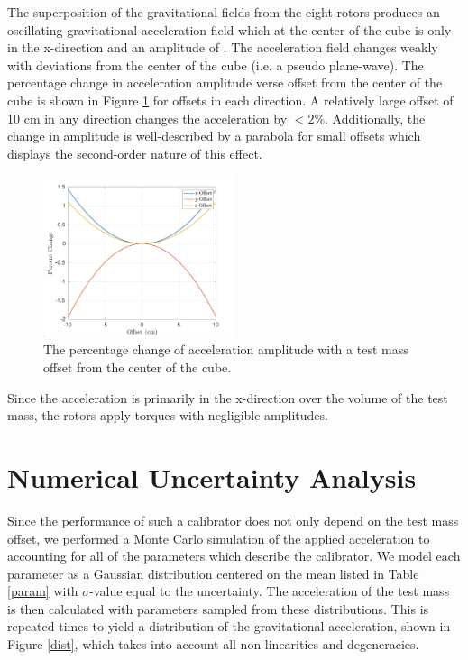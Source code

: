\documentclass[superscriptaddress, twocolumn, prd]{revtex4-1}
\begin{document}
The superposition of the gravitational fields from the eight rotors produces an oscillating gravitational acceleration field which at the center of the cube is only in the x-direction and an amplitude of . The acceleration field changes weakly with deviations from the center of the cube (i.e. a pseudo plane-wave). The percentage change in acceleration amplitude verse offset from the center of the cube is shown in Figure \ref{offset} for offsets in each direction. A relatively large offset of 10 cm in any direction changes the acceleration by $<2\%$. Additionally, the change in amplitude is well-described by a parabola for small offsets which displays the second-order nature of this effect. 


\begin{figure}[!h]
\centering \includegraphics[width=0.5\textwidth]{Super8_PerVsZ.pdf}
\caption{The percentage change of acceleration amplitude with a test mass offset from the center of the cube.}
\label{offset} 
\end{figure}

Since the acceleration is primarily in the x-direction over the volume of the test mass, the rotors apply torques with negligible amplitudes.

\section{Numerical Uncertainty Analysis}

Since the performance of such a calibrator does not only depend on the test mass offset, we performed a Monte Carlo simulation of the applied acceleration to accounting for all of the parameters which describe the calibrator. We model each parameter as a Gaussian distribution centered on the mean listed in Table \ref{param} with $\sigma$-value equal to the uncertainty. The acceleration of the test mass is then calculated with parameters sampled from these distributions. This is repeated  times to yield a distribution of the gravitational acceleration, shown in Figure \ref{dist}, which takes into account all non-linearities and degeneracies. 
\end{document}
